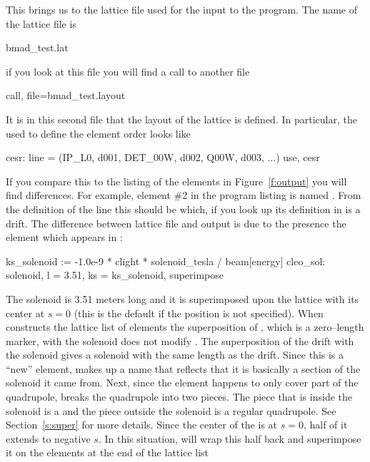 {{{{{{{{{{This brings us to the lattice file used for the input to the program.
The name of the lattice file is 
  \begin{example}
  bmad_test.lat
  \end{example} 
if you look at this file you will find a call to another file
  \begin{example}
  call, file=bmad_test.layout
  \end{example}
It is in this second file
that the layout of the lattice is defined. In particular, the  used
to define the element order looks like
\begin{example}
  cesr: line = (IP_L0, d001, DET_00W, d002, Q00W, d003, ...)
  use, cesr
\end{example}
If you compare this to the listing of the elements in
Figure~\ref{f:output} you will find differences. For example, element
\#2 in the program listing is named . From the
definition of the  line this should be  which, if
you look up its definition in  is a drift.  The
difference between lattice file and output is due to the presence
the  element which appears in :
\begin{example}
  ks_solenoid    := -1.0e-9 * clight * solenoid_tesla / beam[energy]
  cleo_sol: solenoid, l = 3.51, ks = ks_solenoid, superimpose 
\end{example}
The solenoid is 3.51 meters long
and it is superimposed upon the lattice with its center at $s = 0$ (this
is the default if the position is not specified). 
When  constructs the lattice list of elements
the superposition of , which is a zero--length marker, with the
solenoid does not modify . The superposition of the
 drift with the solenoid gives a solenoid with the same
length as the drift. Since this is a ``new'' element, 
makes up a name that reflects that it is basically a section of the
solenoid it came from.  Next, since the  element happens to
only cover
part of the  quadrupole,  breaks the
quadrupole into two pieces. The piece that is inside the solenoid is a
 and the piece outside the solenoid is a regular
quadrupole. See Section~\ref{s:super} for more details. Since the
center of the  is at $s = 0$, half of it extends to
negative $s$. In this situation,  will wrap this half
back and superimpose it on the elements at the end of the lattice list
}}}}}}}}}}
